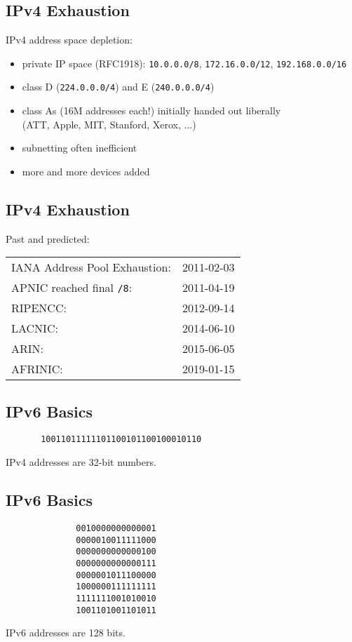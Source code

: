 \documentclass[xga]{xdvislides}
\begin{document}
\subsection{IPv4 Exhaustion}
IPv4 address space depletion: \\

\begin{itemize}
	\item private IP space (RFC1918): \verb+10.0.0.0/8+, \verb+172.16.0.0/12+, \verb+192.168.0.0/16+
	\item class D (\verb+224.0.0.0/4+) and E (\verb+240.0.0.0/4+)
	\item class As (16M addresses each!) initially handed out liberally \\
		(ATT, Apple, MIT, Stanford, Xerox, ...)
	\item subnetting often inefficient
	\item more and more devices added
\end{itemize}

\subsection{IPv4 Exhaustion}
Past and predicted: \\

\begin{tabular}{l r}
IANA Address Pool Exhaustion: & 2011-02-03 \\
APNIC reached final {\tt /8}: & 2011-04-19 \\
RIPENCC: & 2012-09-14 \\
LACNIC: & 2014-06-10 \\
ARIN: & 2015-06-05 \\
AFRINIC: & 2019-01-15 \\
\end{tabular}

\subsection{IPv6 Basics}
\vspace{.5in}
\Hugesize
\begin{center}
\begin{verbatim}
       10011011111101100101100100010110
\end{verbatim}
\vspace{.5in}
IPv4 addresses are 32-bit numbers.
\end{center}
\Normalsize


\subsection{IPv6 Basics}
\Hugesize
\begin{center}
\begin{verbatim}
              0010000000000001
              0000010011111000
              0000000000000100
              0000000000000111
              0000001011100000
              1000000111111111
              1111111001010010
              1001101001101011
\end{verbatim}
\vspace{.5in}
IPv6 addresses are 128 bits.
\end{center}
\Normalsize
\end{document}
